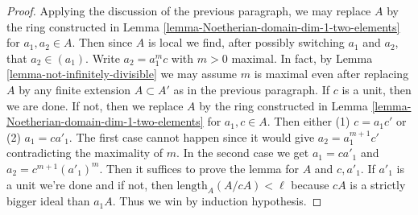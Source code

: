 \documentclass[10pt,a4paper]{amsart}
\theoremstyle{plain}
\theoremstyle{definition}
\theoremstyle{remark}
\numberwithin{equation}{subsection}
\begin{document}
\begin{proof}
\medskip\noindent
Applying the discussion of the previous paragraph,
we may replace $A$ by the ring constructed in
Lemma \ref{lemma-Noetherian-domain-dim-1-two-elements}
for $a_1, a_2 \in A$. Then since $A$ is local we find,
after possibly switching $a_1$ and $a_2$, that $a_2 \in (a_1)$.
Write $a_2 = a_1^m c$ with $m > 0$ maximal. In fact, by
Lemma \ref{lemma-not-infinitely-divisible}
we may assume $m$ is maximal even after replacing $A$
by any finite extension $A \subset A'$ as in the previous paragraph.
If $c$ is a unit, then we are done. If not, then we replace
$A$ by the ring constructed in
Lemma \ref{lemma-Noetherian-domain-dim-1-two-elements}
for $a_1, c \in A$. Then either (1) $c = a_1 c'$ or
(2) $a_1 = c a'_1$. The first case cannot happen since
it would give $a_2 = a_1^{m + 1} c'$ contradicting the
maximality of $m$. In the second case we get
$a_1 = c a'_1$ and $a_2 = c^{m + 1} (a'_1)^m$.
Then it suffices to prove the lemma for $A$ and $c, a'_1$.
If $a'_1$ is a unit we're done and if not, then
$\text{length}_A(A/cA) < \ell$ because $cA$ is a strictly
bigger ideal than $a_1A$. Thus we win by induction hypothesis.
\end{proof}
\end{document}
